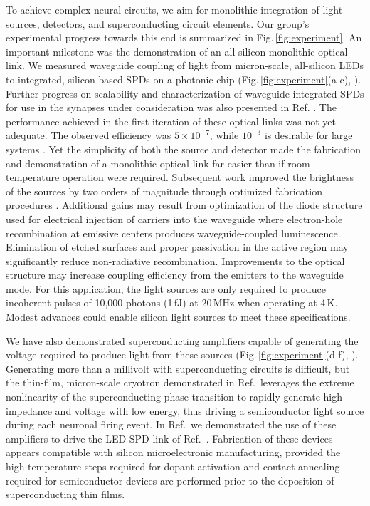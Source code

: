 \documentclass[twocolumn]{article}
\newcommand{\onlinecite}[1]{\hspace{-1 ex} \nocite{#1}\citenum{#1}}
\begin{document}
To achieve complex neural circuits, we aim for monolithic integration of light sources, detectors, and superconducting circuit elements. Our group's experimental progress towards this end is summarized in Fig.\,\ref{fig:experiment}. An important milestone was the demonstration of an all-silicon monolithic optical link. We measured waveguide coupling of light from micron-scale, all-silicon LEDs to integrated, silicon-based SPDs on a  photonic chip (Fig.\,\ref{fig:experiment}(a-c), \cite{buch2017}). Further progress on scalability and characterization of waveguide-integrated SPDs for use in the synapses under consideration was also presented in Ref. \onlinecite{buta2020_2}. The performance achieved in the first iteration of these optical links was not yet adequate. The observed efficiency was $5\times10^{-7}$, while $10^{-3}$ is desirable for large systems \cite{sh2019}. Yet the simplicity of both the source and detector made the fabrication and demonstration of a monolithic optical link far easier than if room-temperature operation were required. Subsequent work improved the brightness of the sources by two orders of magnitude through optimized fabrication procedures \cite{buta2020}. Additional gains may result from optimization of the diode structure used for electrical injection of carriers into the waveguide where electron-hole recombination at emissive centers produces waveguide-coupled luminescence. Elimination of etched surfaces and proper passivation in the active region may significantly reduce non-radiative recombination. Improvements to the optical structure may increase coupling efficiency from the emitters to the waveguide mode. For this application, the light sources are only required to produce incoherent pulses of 10,000 photons (1\,fJ) at 20\,MHz when operating at 4\,K. Modest advances could enable silicon light sources to meet these specifications.

We have also demonstrated superconducting amplifiers capable of generating the voltage required to produce light from these sources (Fig.\,\ref{fig:experiment}(d-f), \cite{mcve2019}). Generating more than a millivolt with superconducting circuits is difficult, but the thin-film, micron-scale cryotron demonstrated in Ref.\,\onlinecite{mcve2019} leverages the extreme nonlinearity of the superconducting phase transition to rapidly generate high impedance and voltage with low energy, thus driving a semiconductor light source during each neuronal firing event. In Ref.\,\onlinecite{mcve2019} we demonstrated the use of these amplifiers to drive the LED-SPD link of Ref.\,\onlinecite{buch2017}. Fabrication of these devices appears compatible with silicon microelectronic manufacturing, provided the high-temperature steps required for dopant activation and contact annealing required for semiconductor devices are performed prior to the deposition of superconducting thin films.
\end{document}

